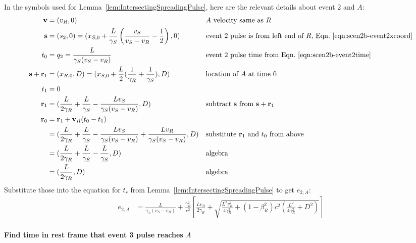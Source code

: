\documentclass[a4paper]{article}
\theoremstyle{plain}
\theoremstyle{definition}
\newcommand{\vect}[1]{\mathbf{#1}}
\begin{document}
In the symbols used for Lemma~\ref{lem:IntersectingSpreadingPulse},
here are the relevant details about event 2 and $A$:
\begin{align*}
\vect{v} & = (v_R, 0) & & \text{$A$ velocity same as $R$} \\
\vect{s} & = (s_2,0) = (x_{S,0} + \frac{L}{\gamma_S} \left( \frac{v_S}{v_S - v_R} - \frac{1}{2} \right), 0) & & \text{event 2 pulse is from left end of $R$, Eqn.~\eqref{eqn:scen2b-event2xcoord}} \\
t_0 & = q_2 = \frac{L}{\gamma_S(v_S - v_R)} & & \text{event 2 pulse time from Eqn.~\eqref{eqn:scen2b-event2time}} \\
\vect{s} + \vect{r}_1 & = (x_{R,0}, D) = (x_{S,0} + \frac{L}{2} ( \frac{1}{\gamma_R} + \frac{1}{\gamma_S} ), D) & & \text{location of $A$ at time 0} \\
t_1 & = 0 \\
\vect{r}_1 & = (\frac{L}{2\gamma_R} + \frac{L}{\gamma_S} - \frac{Lv_S}{\gamma_S(v_S-v_R)}, D) & & \text{subtract $\vect{s}$ from $\vect{s}+\vect{r}_1$} \\
\vect{r}_0
  & = \vect{r}_1 + \vect{v}_R(t_0-t_1) \\
  & = (\frac{L}{2\gamma_R} + \frac{L}{\gamma_S} - \frac{Lv_S}{\gamma_S(v_S-v_R)} + \frac{Lv_R}{\gamma_S(v_S - v_R)}, D) & & \text{substitute $\vect{r}_1$ and $t_0$ from above} \\
  & = (\frac{L}{2\gamma_R} + \frac{L}{\gamma_S} - \frac{L}{\gamma_S}, D) & & \text{algebra} \\
  & = (\frac{L}{2\gamma_R}, D) & & \text{algebra}
\end{align*}
Substitute those into the equation for $t_r$ from
Lemma~\ref{lem:IntersectingSpreadingPulse} to get $e_{2,A}$:
\begin{align*}
e_{2,A} & = \frac{L}{\gamma_S(v_S - v_R)} + \frac{\gamma_R^2}{c^2} \left[ \frac{Lv_R}{2\gamma_R} + \sqrt{\frac{L^2v_R^2}{4\gamma_R^2} + (1-\beta_R^2)c^2 (\frac{L^2}{4\gamma_R^2} + D^2)} \right]
\end{align*}


\paragraph{Find time in rest frame that event 3 pulse reaches $A$}
\end{document}
